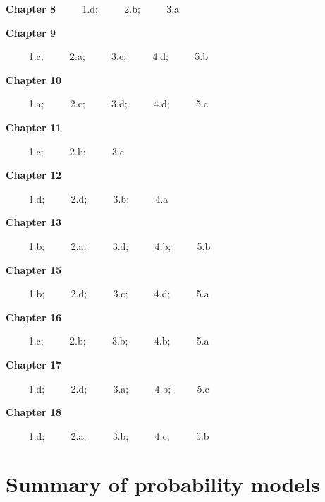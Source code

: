 \documentclass[
]{book}
\begin{document}
\textbf{Chapter 8}
\(\qquad\) 1.d; \(\qquad\) 2.b; \(\qquad\) 3.a

\textbf{Chapter 9}

\(\qquad\) 1.c; \(\qquad\) 2.a; \(\qquad\) 3.c; \(\qquad\) 4.d; \(\qquad\) 5.b

\textbf{Chapter 10}

\(\qquad\) 1.a; \(\qquad\) 2.c; \(\qquad\) 3.d; \(\qquad\) 4.d; \(\qquad\) 5.c

\textbf{Chapter 11}

\(\qquad\) 1.c; \(\qquad\) 2.b; \(\qquad\) 3.c

\textbf{Chapter 12}

\(\qquad\) 1.d; \(\qquad\) 2.d; \(\qquad\) 3.b; \(\qquad\) 4.a

\textbf{Chapter 13}

\(\qquad\) 1.b; \(\qquad\) 2.a; \(\qquad\) 3.d; \(\qquad\) 4.b; \(\qquad\) 5.b

\textbf{Chapter 15}

\(\qquad\) 1.b; \(\qquad\) 2.d; \(\qquad\) 3.c; \(\qquad\) 4.d; \(\qquad\) 5.a

\textbf{Chapter 16}

\(\qquad\) 1.c; \(\qquad\) 2.b; \(\qquad\) 3.b; \(\qquad\) 4.b; \(\qquad\) 5.a

\textbf{Chapter 17}

\(\qquad\) 1.d; \(\qquad\) 2.d; \(\qquad\) 3.a; \(\qquad\) 4.b; \(\qquad\) 5.c

\textbf{Chapter 18}

\(\qquad\) 1.d; \(\qquad\) 2.a; \(\qquad\) 3.b; \(\qquad\) 4.c; \(\qquad\) 5.b

\hypertarget{summary-of-probability-models-1}{%
\section{Summary of probability models}\label{summary-of-probability-models-1}}
\end{document}
